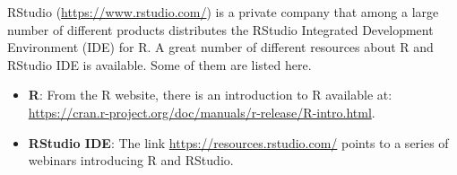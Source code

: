 \documentclass[
]{book}
\providecommand{\tightlist}{%
  \setlength{\itemsep}{0pt}\setlength{\parskip}{0pt}}
\begin{document}
RStudio (\url{https://www.rstudio.com/}) is a private company that among a large number of different products distributes the RStudio Integrated Development Environment (IDE) for R. A great number of different resources about R and RStudio IDE is available. Some of them are listed here.

\begin{itemize}
\tightlist
\item
  \textbf{R}: From the R website, there is an introduction to R available at: \url{https://cran.r-project.org/doc/manuals/r-release/R-intro.html}.
\item
  \textbf{RStudio IDE}: The link \url{https://resources.rstudio.com/} points to a series of webinars introducing R and RStudio.
\end{itemize}

  
\end{document}
